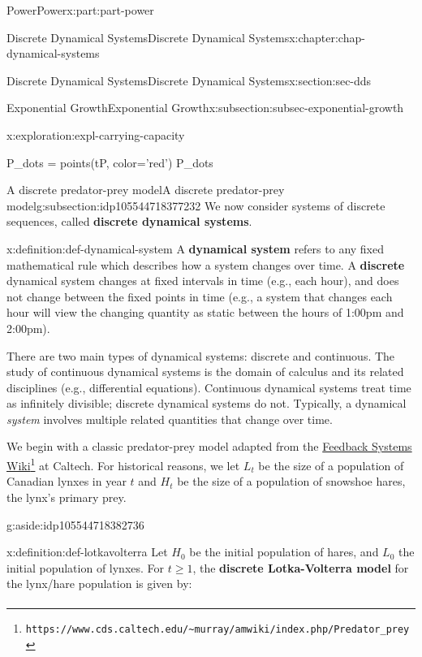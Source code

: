 \documentclass[oneside,10pt,]{book}
\newcommand{\terminology}[1]{\textbf{#1}}
\numberwithin{equation}{section}
\renewcommand{\ge}{\geqslant}
\begin{document}
\begin{partptx}{Power}{}{Power}{}{}{x:part:part-power}
\begin{chapterptx}{Discrete Dynamical Systems}{}{Discrete Dynamical Systems}{}{}{x:chapter:chap-dynamical-systems}
\begin{sectionptx}{Discrete Dynamical Systems}{}{Discrete Dynamical Systems}{}{}{x:section:sec-dds}
\begin{subsectionptx}{Exponential Growth}{}{Exponential Growth}{}{}{x:subsection:subsec-exponential-growth}
\begin{exploration}{}{x:exploration:expl-carrying-capacity}
\begin{sageinput}
P_dots = points(tP, color='red')
P_dots
\end{sageinput}
\end{exploration}%
\end{subsectionptx}
%
%
\typeout{************************************************}
\typeout{************************************************}
%
\begin{subsectionptx}{A discrete predator-prey model}{}{A discrete predator-prey model}{}{}{g:subsection:idp105544718377232}
We now consider systems of discrete sequences, called \terminology{discrete dynamical systems}.%
\begin{definition}{}{x:definition:def-dynamical-system}%
A \terminology{dynamical system} refers to any fixed mathematical rule which describes how a system changes over time. A \terminology{discrete} dynamical system changes at fixed intervals in time (e.g., each hour), and does not change between the fixed points in time (e.g., a system that changes each hour will view the changing quantity as static between the hours of 1:00pm and 2:00pm).%
\end{definition}
There are two main types of dynamical systems: discrete and continuous. The study of continuous dynamical systems is the domain of calculus and its related disciplines (e.g., differential equations). Continuous dynamical systems treat time as infinitely divisible; discrete dynamical systems do not. Typically, a dynamical \emph{system} involves multiple related quantities that change over time.%
\par
We begin with a classic predator-prey model adapted from the \href{https://www.cds.caltech.edu/\~murray/amwiki/index.php/Predator_prey}{Feedback Systems Wiki}\footnote{\nolinkurl{https://www.cds.caltech.edu/\~murray/amwiki/index.php/Predator_prey}\label{g:fn:idp105544718381200}} at Caltech. For historical reasons, we let \(L_t\) be the size of a population of Canadian lynxes in year \(t\) and \(H_t\) be the size of a population of snowshoe hares, the lynx's primary prey. \begin{aside}{}{g:aside:idp105544718382736}%
\end{aside}
%
\begin{definition}{}{x:definition:def-lotkavolterra}%
Let \(H_0\) be the initial population of hares, and \(L_0\) the initial population of lynxes. For \(t\ge 1\), the \terminology{discrete Lotka-Volterra model} for the lynx\slash{}hare population is given by:%
%
\begin{align*}

\end{align*}
\end{definition}
\end{subsectionptx}
\end{sectionptx}
\end{chapterptx}
\end{partptx}
\end{document}
